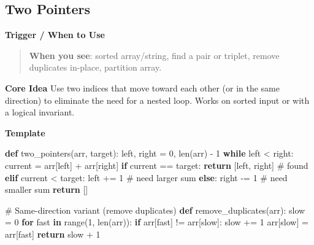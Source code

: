 \documentclass[11pt]{article}
\newenvironment{Shaded}{\begin{snugshade}}{\end{snugshade}}
\newcommand{\BuiltInTok}[1]{\textcolor[rgb]{0.50,0.55,0.55}{#1}}
\newcommand{\CommentTok}[1]{\textcolor[rgb]{0.48,0.49,0.49}{#1}}
\newcommand{\ControlFlowTok}[1]{\textcolor[rgb]{0.99,0.74,0.29}{\textbf{#1}}}
\newcommand{\DecValTok}[1]{\textcolor[rgb]{0.96,0.45,0.00}{#1}}
\newcommand{\KeywordTok}[1]{\textcolor[rgb]{0.81,0.81,0.76}{\textbf{#1}}}
\newcommand{\NormalTok}[1]{\textcolor[rgb]{0.81,0.81,0.76}{#1}}
\newcommand{\OperatorTok}[1]{\textcolor[rgb]{0.81,0.81,0.76}{#1}}
\begin{document}
\subsection{Two Pointers}\label{two-pointers}


\textbf{Trigger / When to Use}

\begin{quote}
\textbf{When you see}: sorted array/string, find a pair or triplet, remove duplicates in-place, partition array.
\end{quote}

\textbf{Core Idea}
Use two indices that move toward each other (or in the same direction) to eliminate the need for a nested loop. Works on sorted input or with a logical invariant.

\textbf{Template}


\begin{Shaded}
\begin{Highlighting}[]
\KeywordTok{def}\NormalTok{ two\_pointers(arr, target):}
\NormalTok{    left, right }\OperatorTok{=} \DecValTok{0}\NormalTok{, }\BuiltInTok{len}\NormalTok{(arr) }\OperatorTok{{-}} \DecValTok{1}
    \ControlFlowTok{while}\NormalTok{ left }\OperatorTok{\textless{}}\NormalTok{ right:}
\NormalTok{        current }\OperatorTok{=}\NormalTok{ arr[left] }\OperatorTok{+}\NormalTok{ arr[right]}
        \ControlFlowTok{if}\NormalTok{ current }\OperatorTok{==}\NormalTok{ target:}
            \ControlFlowTok{return}\NormalTok{ [left, right]          }\CommentTok{\# found}
        \ControlFlowTok{elif}\NormalTok{ current }\OperatorTok{\textless{}}\NormalTok{ target:}
\NormalTok{            left }\OperatorTok{+=} \DecValTok{1}                     \CommentTok{\# need larger sum}
        \ControlFlowTok{else}\NormalTok{:}
\NormalTok{            right }\OperatorTok{{-}=} \DecValTok{1}                    \CommentTok{\# need smaller sum}
    \ControlFlowTok{return}\NormalTok{ []}

\CommentTok{\# Same{-}direction variant (remove duplicates)}
\KeywordTok{def}\NormalTok{ remove\_duplicates(arr):}
\NormalTok{    slow }\OperatorTok{=} \DecValTok{0}
    \ControlFlowTok{for}\NormalTok{ fast }\KeywordTok{in} \BuiltInTok{range}\NormalTok{(}\DecValTok{1}\NormalTok{, }\BuiltInTok{len}\NormalTok{(arr)):}
        \ControlFlowTok{if}\NormalTok{ arr[fast] }\OperatorTok{!=}\NormalTok{ arr[slow]:}
\NormalTok{            slow }\OperatorTok{+=} \DecValTok{1}
\NormalTok{            arr[slow] }\OperatorTok{=}\NormalTok{ arr[fast]}
    \ControlFlowTok{return}\NormalTok{ slow }\OperatorTok{+} \DecValTok{1}
\end{Highlighting}
\end{Shaded}
\end{document}
